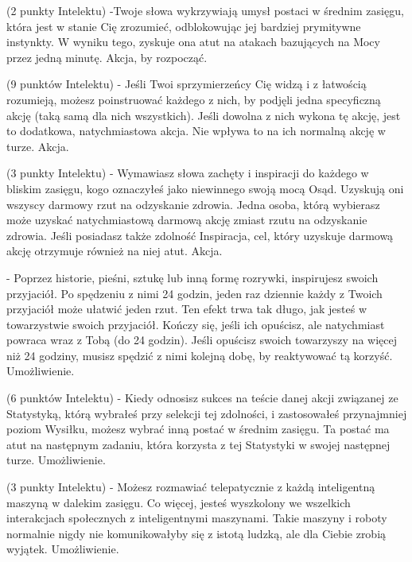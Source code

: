 { (2 punkty Intelektu) -Twoje słowa wykrzywiają umysł postaci w średnim zasięgu, która jest w stanie Cię zrozumieć, odblokowując jej bardziej prymitywne instynkty. W wyniku tego, zyskuje ona atut na atakach bazujących na Mocy przez jedną minutę. Akcja, by rozpocząć.

 (9 punktów Intelektu) - Jeśli Twoi sprzymierzeńcy Cię widzą i z łatwością rozumieją, możesz poinstruować każdego z nich, by podjęli jedna specyficzną akcję (taką samą dla nich wszystkich). Jeśli dowolna z nich wykona tę akcję, jest to dodatkowa, natychmiastowa akcja. Nie wpływa to na ich normalną akcję w turze. Akcja.

 (3 punkty Intelektu) - Wymawiasz słowa zachęty i inspiracji do każdego w bliskim zasięgu, kogo oznaczyłeś jako niewinnego swoją mocą Osąd. Uzyskują oni wszyscy darmowy rzut na odzyskanie zdrowia. Jedna osoba, którą wybierasz może uzyskać natychmiastową darmową akcję  zmiast rzutu na odzyskanie zdrowia. Jeśli posiadasz także zdolność Inspiracja, cel, który uzyskuje darmową akcję otrzymuje również na niej atut. Akcja. 

 - Poprzez historie, pieśni, sztukę lub inną formę rozrywki, inspirujesz swoich przyjaciół. Po spędzeniu z nimi 24 godzin, jeden raz dziennie każdy z Twoich przyjaciół może ułatwić jeden rzut. Ten efekt trwa tak długo, jak jesteś w towarzystwie swoich przyjaciół. Kończy się, jeśli ich opuścisz, ale natychmiast powraca wraz z Tobą (do 24 godzin). Jeśli opuścisz swoich towarzyszy na więcej niż 24 godziny, musisz spędzić z nimi kolejną dobę, by reaktywować tą korzyść. Umożliwienie. 

 (6 punktów Intelektu) - Kiedy odnosisz sukces na teście danej akcji związanej ze Statystyką, którą wybrałeś przy selekcji tej zdolności, i zastosowałeś przynajmniej poziom Wysiłku, możesz wybrać inną postać w średnim zasięgu. Ta postać ma atut na następnym zadaniu, która korzysta z tej Statystyki w swojej następnej turze. Umożliwienie.

 (3 punkty Intelektu) - Możesz rozmawiać telepatycznie z każdą inteligentną maszyną w dalekim zasięgu. Co więcej, jesteś wyszkolony we wszelkich interakcjach społecznych z inteligentnymi maszynami. Takie maszyny i roboty normalnie nigdy nie komunikowałyby się z istotą ludzką, ale dla Ciebie zrobią wyjątek. Umożliwienie.

}
